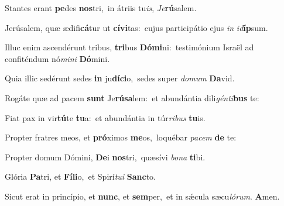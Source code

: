 \vs Stantes erant \textbf{pe}des \textbf{nos}tri,~\redgreheightstar in átriis tu\textit{is}, \textit{Je}\textbf{rú}salem.

\vs Jerúsalem, quæ ædifi\textbf{cá}tur ut \textbf{cí}\-\textbf{vi}\-tas:~\redgreheightstar cujus participátio ejus \textit{in} \textit{id}\textbf{íp}sum.

\vs Illuc enim ascendérunt tribus, \textbf{tri}bus \textbf{Dó}\textbf{mi}ni:~\redgreheightstar testimónium Israël ad confiténdum nó\textit{mi}\textit{ni} \textbf{Dó}mini.

\vs Quia illic sedérunt sedes \textbf{in} ju\-\textbf{dí}\-\textbf{ci}o,~\redgreheightstar sedes super \textit{do}\textit{mum} \textbf{Da}vid.

\vs Rogáte quæ ad pacem \textbf{sunt} Je\-\textbf{rú}\-\textbf{sa}\-lem:~\redgreheightstar et abundántia dili\textit{gén}\textit{ti}\textbf{bus} te:

\vs Fiat pax in vir\textbf{tú}te \textbf{tu}a:~\redgreheightstar et abundántia in túr\textit{ri}\textit{bus} \textbf{tu}is.

\vs Propter fratres meos, et \textbf{pró}ximos \textbf{me}os,~\redgreheightstar loquébar \textit{pa}\textit{cem} \textbf{de} te:

\vs Propter domum Dómini, \textbf{De}i \textbf{nos}tri,~\redgreheightstar quæsívi \textit{bo}\textit{na} \textbf{ti}bi.

\vs Glória \textbf{Pa}tri, et \textbf{Fí}\textbf{li}o,~\redgreheightstar et Spirí\textit{tu}\textit{i} \textbf{Sanc}to.

\vs Sicut erat in princípio, et \textbf{nunc}, et \textbf{sem}per,~\redgreheightstar et in sǽcula sæcu\textit{ló}\textit{rum}. \textbf{A}men.

